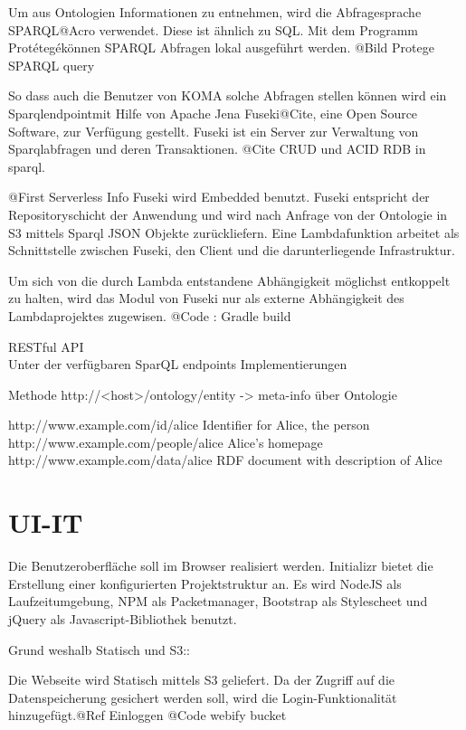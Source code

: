 \documentclass[
12pt,
english,
ngerman,
headsepline,
twoside,
openright,
numbers=noenddot,version=first
]{scrreprt}
\begin{document}
Um aus Ontologien Informationen zu entnehmen, wird die Abfragesprache \glqq SPARQL\grqq @Acro verwendet. Diese ist ähnlich zu SQL. Mit dem Programm \glqq Protétegé\grqq können SPARQL Abfragen lokal ausgeführt werden. 
@Bild Protege SPARQL query

So dass auch die Benutzer von KOMA solche Abfragen stellen können wird ein \glqq Sparqlendpoint\grqq mit Hilfe von Apache Jena Fuseki@Cite, eine Open Source Software, zur Verfügung gestellt. Fuseki ist ein Server zur Verwaltung von Sparqlabfragen und deren Transaktionen. @Cite CRUD und ACID RDB in sparql. 

@First Serverless Info
Fuseki wird Embedded benutzt.
Fuseki entspricht der Repositoryschicht der Anwendung und wird nach Anfrage von der Ontologie in S3 mittels Sparql JSON Objekte zurückliefern. 
Eine Lambdafunktion arbeitet als Schnittstelle zwischen Fuseki, den Client und die darunterliegende Infrastruktur. 

Um sich von die durch Lambda entstandene Abhängigkeit möglichst entkoppelt\cite{FlowerRefactoring} zu halten, wird das Modul von Fuseki nur als externe Abhängigkeit des Lambdaprojektes zugewisen. 
@Code : Gradle build\cite{Muschko2014}

RESTful API \\
Unter der verfügbaren SparQL endpoints Implementierungen

Methode http://<host>/ontology/entity -> meta-info über Ontologie

http://www.example.com/id/alice
Identifier for Alice, the person
http://www.example.com/people/alice
Alice's homepage
http://www.example.com/data/alice
RDF document with description of Alice

\section{UI-IT}

Die Benutzeroberfläche soll im Browser realisiert werden. Initializr bietet die Erstellung einer konfigurierten Projektstruktur an. Es wird NodeJS als Laufzeitumgebung, NPM als Packetmanager, Bootstrap als Stylescheet und jQuery als Javascript-Bibliothek benutzt. 

Grund weshalb Statisch und S3:: 

Die Webseite wird Statisch mittels S3 geliefert. Da der Zugriff auf die Datenspeicherung gesichert werden soll, wird die  Login-Funktionalität hinzugefügt.@Ref Einloggen
@Code webify bucket
\end{document}
